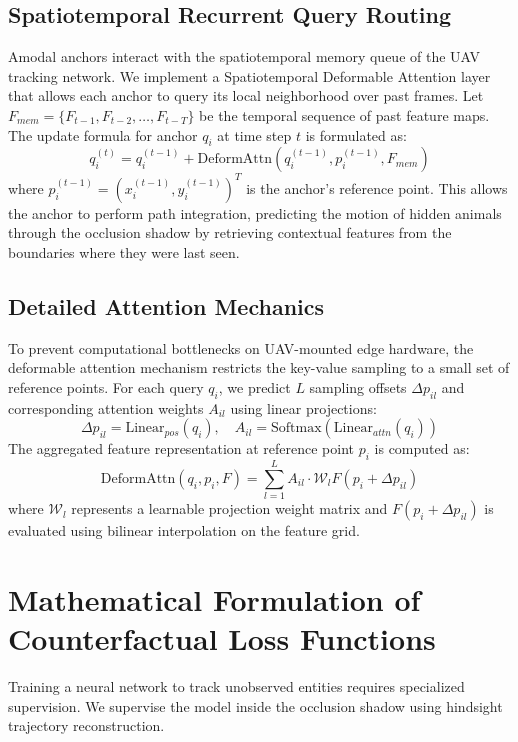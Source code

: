 \documentclass[10pt,conference,letterpaper,twocolumn]{article}
\begin{document}
\subsection{Spatiotemporal Recurrent Query Routing}
Amodal anchors interact with the spatiotemporal memory queue of the UAV tracking network. We implement a Spatiotemporal Deformable Attention layer that allows each anchor to query its local neighborhood over past frames. Let $F_{mem} = \{F_{t-1}, F_{t-2}, \dots, F_{t-T}\}$ be the temporal sequence of past feature maps. The update formula for anchor $q_i$ at time step $t$ is formulated as:
\begin{equation}
q_i^{(t)} = q_i^{(t-1)} + \text{DeformAttn}\left(q_i^{(t-1)}, p_i^{(t-1)}, F_{mem}\right)
\end{equation}
where $p_i^{(t-1)} = (x_i^{(t-1)}, y_i^{(t-1)})^T$ is the anchor's reference point. This allows the anchor to perform path integration, predicting the motion of hidden animals through the occlusion shadow by retrieving contextual features from the boundaries where they were last seen.

\subsection{Detailed Attention Mechanics}
To prevent computational bottlenecks on UAV-mounted edge hardware, the deformable attention mechanism restricts the key-value sampling to a small set of reference points. For each query $q_i$, we predict $L$ sampling offsets $\Delta p_{il}$ and corresponding attention weights $A_{il}$ using linear projections:
\begin{equation}
\Delta p_{il} = \text{Linear}_{pos}(q_i), \quad A_{il} = \text{Softmax}(\text{Linear}_{attn}(q_i))
\end{equation}
The aggregated feature representation at reference point $p_i$ is computed as:
\begin{equation}
\text{DeformAttn}(q_i, p_i, F) = \sum_{l=1}^{L} A_{il} \cdot \mathcal{W}_l F(p_i + \Delta p_{il})
\end{equation}
where $\mathcal{W}_l$ represents a learnable projection weight matrix and $F(p_i + \Delta p_{il})$ is evaluated using bilinear interpolation on the feature grid.

\section{Mathematical Formulation of Counterfactual Loss Functions}
Training a neural network to track unobserved entities requires specialized supervision. We supervise the model inside the occlusion shadow using hindsight trajectory reconstruction.
\end{document}
